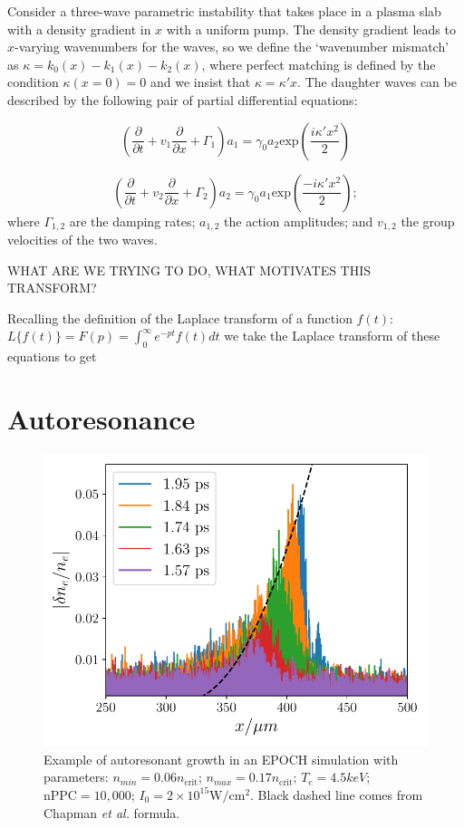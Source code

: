 Consider a three-wave parametric instability that takes place in a plasma slab with a density gradient in $x$ with a uniform pump. The density gradient leads to $x$-varying wavenumbers for the waves, so we define the `wavenumber mismatch' as $\kappa = k_0(x) - k_1(x) - k_2(x)$, where perfect matching is defined by the condition $\kappa(x=0) = 0$ and we insist that $\kappa = \kappa' x$. The daughter waves can be described by the following pair of partial differential equations:

\begin{equation}
 \left(\frac{\partial}{\partial t} + v_1\frac{\partial}{\partial x} + \Gamma_1 \right)a_1 = \gamma_0a_2\text{exp}\left(\frac{i\kappa'x^2}{2}\right)
\end{equation}

\begin{equation}
 \left(\frac{\partial}{\partial t} + v_2\frac{\partial}{\partial x} + \Gamma_2 \right)a_2 = \gamma_0a_1\text{exp}\left(\frac{-i\kappa'x^2}{2}\right);
\end{equation} 
where $\Gamma_{1,2}$ are the damping rates; $a_{1,2}$ the action amplitudes; and $v_{1,2}$ the group velocities of the two waves. 

WHAT ARE WE TRYING TO DO, WHAT MOTIVATES THIS TRANSFORM?

Recalling the definition of the Laplace transform of a function $f(t)$: $L\{f(t)\}= F(p) = \int_0^\infty e^{-pt} f(t) dt$ we take the Laplace transform of these equations to get






\section{Autoresonance}

\begin{figure}[ht]
    \centering
    \includegraphics[width=0.8\columnwidth]{Chapters/C2_Theory/AR_diagnostic.pdf}
    \caption{Example of autoresonant growth in an EPOCH simulation with parameters: $n_{min} = 0.06 n_{\text{crit}}$; $n_{max} = 0.17 n_{\text{crit}}$; $T_e = 4.5\si{keV}$; $\text{nPPC}=10,000$; $I_0 = 2 \times 10^{15}\si{\watt / \centi\metre^2}$. Black dashed line comes from Chapman \textit{et al.} \citep{Chapman2012} formula.}
    \label{fig:AR_diagnostic}
\end{figure}{}

%
%
